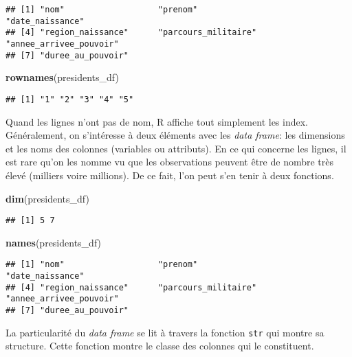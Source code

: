\documentclass[]{book}
\newenvironment{Shaded}{\begin{snugshade}}{\end{snugshade}}
\newcommand{\KeywordTok}[1]{\textcolor[rgb]{0.13,0.29,0.53}{\textbf{#1}}}
\newcommand{\NormalTok}[1]{#1}
\begin{document}
\begin{verbatim}
## [1] "nom"                   "prenom"                "date_naissance"       
## [4] "region_naissance"      "parcours_militaire"    "annee_arrivee_pouvoir"
## [7] "duree_au_pouvoir"
\end{verbatim}

\begin{Shaded}
\begin{Highlighting}[]
\KeywordTok{rownames}\NormalTok{(presidents_df)}
\end{Highlighting}
\end{Shaded}

\begin{verbatim}
## [1] "1" "2" "3" "4" "5"
\end{verbatim}

Quand les lignes n'ont pas de nom, R affiche tout simplement les index.
Généralement, on s'intéresse à deux éléments avec les \emph{data frame}:
les dimensions et les noms des colonnes (variables ou attributs). En ce
qui concerne les lignes, il est rare qu'on les nomme vu que les
observations peuvent être de nombre très élevé (milliers voire
millions). De ce fait, l'on peut s'en tenir à deux fonctions.

\begin{Shaded}
\begin{Highlighting}[]
\KeywordTok{dim}\NormalTok{(presidents_df)}
\end{Highlighting}
\end{Shaded}

\begin{verbatim}
## [1] 5 7
\end{verbatim}

\begin{Shaded}
\begin{Highlighting}[]
\KeywordTok{names}\NormalTok{(presidents_df)}
\end{Highlighting}
\end{Shaded}

\begin{verbatim}
## [1] "nom"                   "prenom"                "date_naissance"       
## [4] "region_naissance"      "parcours_militaire"    "annee_arrivee_pouvoir"
## [7] "duree_au_pouvoir"
\end{verbatim}

La particularité du \emph{data frame} se lit à travers la fonction
\texttt{str} qui montre sa structure. Cette fonction montre le classe
des colonnes qui le constituent.
\end{document}
